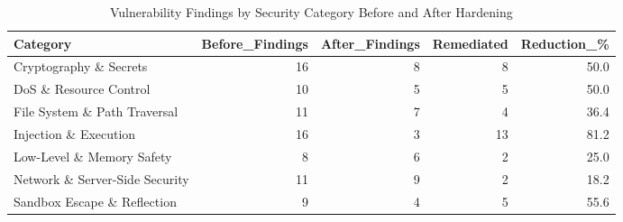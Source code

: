\begin{table}[htbp]
\centering
\caption{Vulnerability Findings by Security Category Before and After Hardening}
\label{tab:category_breakdown}
\begin{tabular}{lrrrr}
\hline
\textbf{Category} & \textbf{Before\_Findings} & \textbf{After\_Findings} & \textbf{Remediated} & \textbf{Reduction\_\%} \\
\hline
Cryptography \& Secrets & 16 & 8 & 8 & 50.0 \\
DoS \& Resource Control & 10 & 5 & 5 & 50.0 \\
File System \& Path Traversal & 11 & 7 & 4 & 36.4 \\
Injection \& Execution & 16 & 3 & 13 & 81.2 \\
Low-Level \& Memory Safety & 8 & 6 & 2 & 25.0 \\
Network \& Server-Side Security & 11 & 9 & 2 & 18.2 \\
Sandbox Escape \& Reflection & 9 & 4 & 5 & 55.6 \\
\hline
\end{tabular}
\end{table}